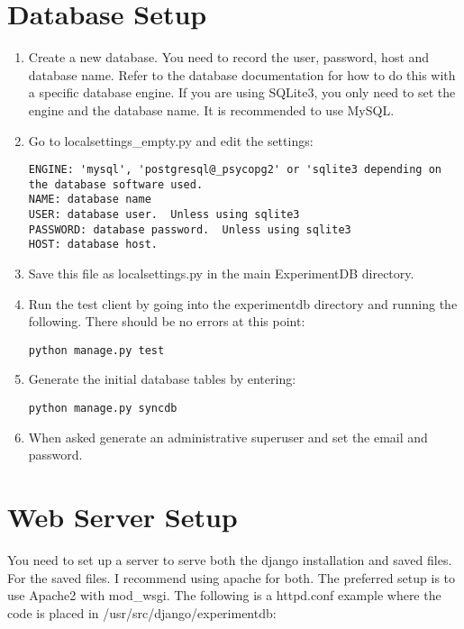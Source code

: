 \documentclass[letterpaper,10pt,english]{sphinxmanual}
\begin{document}
\section{Database Setup}
\label{installation:database-setup}\label{installation:pil}\begin{enumerate}
\item {} 
Create a new database.  You need to record the user, password, host and database name.  Refer to the database documentation for how to do this with a specific database engine.  If you are using SQLite3, you only need to set the engine and the database name.  It is recommended to use MySQL.


\item {} 
Go to localsettings\_empty.py and edit the settings:


\begin{Verbatim}[commandchars=@\[\]]
ENGINE: 'mysql', 'postgresql@_psycopg2' or 'sqlite3 depending on the database software used.
NAME: database name
USER: database user.  Unless using sqlite3
PASSWORD: database password.  Unless using sqlite3
HOST: database host.
\end{Verbatim}

\item {} 
Save this file as localsettings.py in the main ExperimentDB directory.


\item {} 
Run the test client by going into the experimentdb directory and running the following.  There should be no errors at this point:


\begin{Verbatim}[commandchars=@\[\]]
python manage.py test
\end{Verbatim}

\item {} 
Generate the initial database tables by entering:


\begin{Verbatim}[commandchars=@\[\]]
python manage.py syncdb
\end{Verbatim}

\item {} 
When asked generate an administrative superuser and set the email and password.


\end{enumerate}


\section{Web Server Setup}
\label{installation:web-server-setup}
You need to set up a server to serve both the django installation and saved files.  For the saved files.  I recommend using apache for both.  The preferred setup is to use Apache2 with mod\_wsgi.  The following is a httpd.conf example where the code is placed in /usr/src/django/experimentdb:
\end{document}
